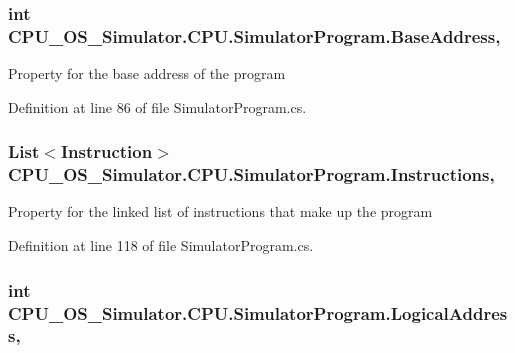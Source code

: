 \subsubsection[{Base\+Address}]{\setlength{\rightskip}{0pt plus 5cm}int C\+P\+U\+\_\+\+O\+S\+\_\+\+Simulator.\+C\+P\+U.\+Simulator\+Program.\+Base\+Address\hspace{0.3cm}{\ttfamily [get]}, {\ttfamily [set]}}\label{class_c_p_u___o_s___simulator_1_1_c_p_u_1_1_simulator_program_ad07bee447d47fb07243a4484b5740c21}


Property for the base address of the program 



Definition at line 86 of file Simulator\+Program.\+cs.

\hypertarget{class_c_p_u___o_s___simulator_1_1_c_p_u_1_1_simulator_program_ae64c462081a1806d5f194c271dbb2686}{}
\subsubsection[{Instructions}]{\setlength{\rightskip}{0pt plus 5cm}List$<${\bf Instruction}$>$ C\+P\+U\+\_\+\+O\+S\+\_\+\+Simulator.\+C\+P\+U.\+Simulator\+Program.\+Instructions\hspace{0.3cm}{\ttfamily [get]}, {\ttfamily [set]}}\label{class_c_p_u___o_s___simulator_1_1_c_p_u_1_1_simulator_program_ae64c462081a1806d5f194c271dbb2686}


Property for the linked list of instructions that make up the program 



Definition at line 118 of file Simulator\+Program.\+cs.

\hypertarget{class_c_p_u___o_s___simulator_1_1_c_p_u_1_1_simulator_program_afda25ae1ba65b33787dfc1f9af1c1d8a}{}
\subsubsection[{Logical\+Address}]{\setlength{\rightskip}{0pt plus 5cm}int C\+P\+U\+\_\+\+O\+S\+\_\+\+Simulator.\+C\+P\+U.\+Simulator\+Program.\+Logical\+Address\hspace{0.3cm}{\ttfamily [get]}, {\ttfamily [set]}}\label{class_c_p_u___o_s___simulator_1_1_c_p_u_1_1_simulator_program_afda25ae1ba65b33787dfc1f9af1c1d8a}


